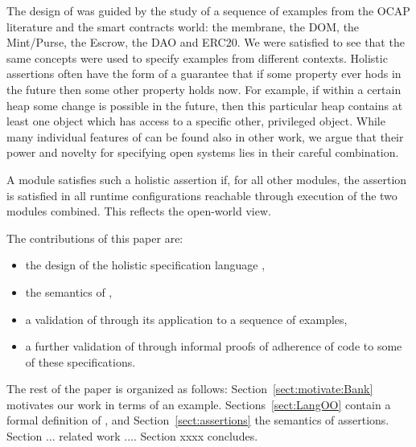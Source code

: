 The design of \Chainmail was guided by the study of a sequence of examples from the OCAP literature and the 
smart contracts world: the membrane, the DOM, the Mint/Purse, the Escrow, the DAO and ERC20. 
We were satisfied to see that the same concepts were used to specify examples from  different contexts.
Holistic assertions often have the form of a guarantee
 that if some property ever hods in the future then some other property holds now.
For example, if within a certain heap some change is possible in the future, then this particular heap contains 
at least one object which has access to a specific other, privileged object.
%
While many individual features of \Chainmail can be found also in other work, 
we argue that their power and novelty for specifying open systems lies in their careful combination.
{}
 
A module satisfies such a holistic assertion if, for all other modules,
  the assertion is satisfied  in all runtime configurations reachable through execution of the two modules combined.
  This reflects the open-world view.
  
The contributions of this paper are:
\begin{itemize}
\item the design of the holistic specification language \Chainmail,
\item the semantics of \Chainmail,
\item a validation of \Chainmail through its application to a sequence of examples,
\item a further validation of \Chainmail through informal proofs of adherence of code to some of these specifications.
\end{itemize}  
  
  
The rest of the paper is organized as follows: Section~\ref{sect:motivate:Bank} 
motivates our work in terms of an example. Sections~\ref{sect:LangOO} contain a formal definition of \LangOO, and Section~\ref{sect:assertions} the semantics of assertions. Section ... related work .... Section xxxx concludes.

